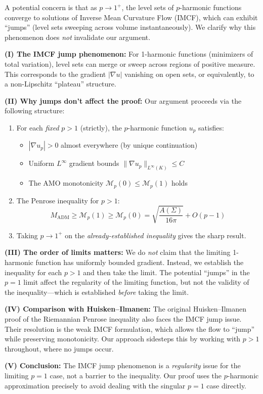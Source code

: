 \begin{remark}\label{rem:IMCFJumps}
A potential concern is that as $p \to 1^+$, the level sets of $p$-harmonic functions converge to solutions of Inverse Mean Curvature Flow (IMCF), which can exhibit ``jumps'' (level sets sweeping across volume instantaneously). We clarify why this phenomenon does \emph{not} invalidate our argument.

\textbf{(I) The IMCF jump phenomenon:} For 1-harmonic functions (minimizers of total variation), level sets can merge or sweep across regions of positive measure. This corresponds to the gradient $|\nabla u|$ vanishing on open sets, or equivalently, to a non-Lipschitz ``plateau'' structure.

\textbf{(II) Why jumps don't affect the proof:} Our argument proceeds via the following structure:
\begin{enumerate}
    \item For each \emph{fixed} $p > 1$ (strictly), the $p$-harmonic function $u_p$ satisfies:
    \begin{itemize}
        \item $|\nabla u_p| > 0$ almost everywhere (by unique continuation)
        \item Uniform $L^\infty$ gradient bounds $\|\nabla u_p\|_{L^\infty(K)} \le C$
        \item The AMO monotonicity $\mathcal{M}_p(0) \le \mathcal{M}_p(1)$ holds
    \end{itemize}
    
    \item The Penrose inequality for $p > 1$:
    \[
    M_{\text{ADM}} \ge \mathcal{M}_p(1) \ge \mathcal{M}_p(0) = \sqrt{\frac{A(\Sigma)}{16\pi}} + O(p-1)
    \]
    
    \item Taking $p \to 1^+$ on the \emph{already-established inequality} gives the sharp result.
\end{enumerate}

\textbf{(III) The order of limits matters:} We do \emph{not} claim that the limiting 1-harmonic function has uniformly bounded gradient. Instead, we establish the inequality for each $p > 1$ and then take the limit. The potential ``jumps'' in the $p = 1$ limit affect the regularity of the limiting function, but not the validity of the inequality---which is established \emph{before} taking the limit.

\textbf{(IV) Comparison with Huisken--Ilmanen:} The original Huisken--Ilmanen proof of the Riemannian Penrose inequality also faces the IMCF jump issue. Their resolution is the weak IMCF formulation, which allows the flow to ``jump'' while preserving monotonicity. Our approach sidesteps this by working with $p > 1$ throughout, where no jumps occur.

\textbf{(V) Conclusion:} The IMCF jump phenomenon is a \emph{regularity} issue for the limiting $p = 1$ case, not a barrier to the inequality. Our proof uses the $p$-harmonic approximation precisely to avoid dealing with the singular $p = 1$ case directly.
\end{remark}


